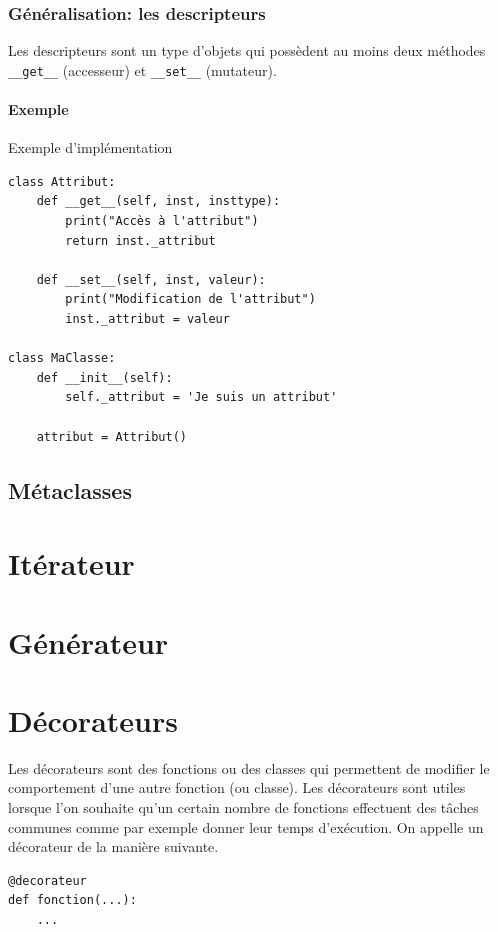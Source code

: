 \documentclass[a4paper, 10pt]{article}
\newcommand{\code}[1]{{\small\texttt{#1}}}
\begin{document}
\subsubsection{Généralisation: les descripteurs}
Les descripteurs sont un type d'objets qui possèdent au moins deux méthodes \code{\_\_get\_\_} (accesseur) et \code{\_\_set\_\_} (mutateur).
\paragraph{Exemple} Exemple d'implémentation
\begin{verbatim}
class Attribut:
    def __get__(self, inst, insttype):
        print("Accès à l'attribut")
        return inst._attribut
 
    def __set__(self, inst, valeur):
        print("Modification de l'attribut")
        inst._attribut = valeur

class MaClasse:
    def __init__(self):
        self._attribut = 'Je suis un attribut'

    attribut = Attribut()
\end{verbatim}
\subsection{Métaclasses}

\section{Itérateur}
\section{Générateur}
\section{Décorateurs}
Les décorateurs sont des fonctions ou des classes qui permettent de modifier le comportement d'une autre fonction (ou classe). Les décorateurs sont utiles lorsque l'on souhaite qu'un certain nombre de fonctions effectuent des t\^aches communes comme par exemple donner leur temps d'exécution. On appelle un décorateur de la manière suivante.

\begin{verbatim}
@decorateur
def fonction(...):
    ...
\end{verbatim}
\end{document}
